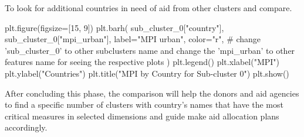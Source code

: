 \documentclass{swfuthesise}
\begin{document}
To look for additional countries in need of aid from other clusters and compare.

\begin{pythoncode}
plt.figure(figsize=[15, 9])
plt.barh(
    sub_cluster_0["country"],
    sub_cluster_0["mpi_urban"],
    label="MPI urban",
    color="r",  # change 'sub_cluster_0' to other subclusters name and change the 'mpi_urban' to other features name for seeing the respective plots
)
plt.legend()
plt.xlabel("MPI")
plt.ylabel("Countries")
plt.title("MPI by Country for Sub-cluster 0")
plt.show()
\end{pythoncode}
After concluding this phase, the comparison will help the donors and aid agencies to find a specific number of clusters with country's names that have the most critical measures in selected dimensions and guide make aid allocation plans accordingly.
\end{document}
